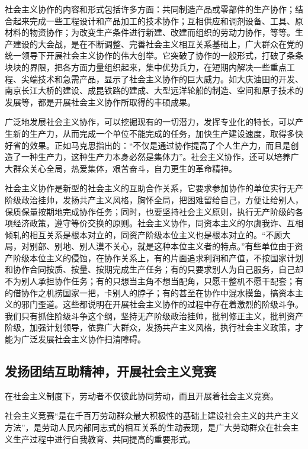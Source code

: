 \documentclass{book}
\begin{document}
社会主义协作的内容和形式包括许多方面：共同制造产品或零部件的生产协作；结合起来完成一些工程设计和产品加工的技术协作；互相供应和调剂设备、工具、原材料的物资协作；为改变生产条件进行新建、改建而组织的劳动力协作，等等。生产建设的大会战，是在不断调整、完善社会主义相互关系基础上，广大群众在党的统一领导下开展社会主义协作的伟大创举。它突破了协作的一般形式，打破了条条块块的界限，把各方面力量组织起来，集中优势兵力，在短期内解决一些重点工程、尖端技术和急需产品，显示了社会主义协作的巨大威力。如大庆油田的开发、南京长江大桥的建设、成昆铁路的建成、大型远洋轮船的制造、空间和原子技术的发展等，都是开展社会主义协作所取得的丰硕成果。

广泛地发展社会主义协作，可以挖掘现有的一切潜力，发挥专业化的特长，可以产生新的生产力，从而完成一个单位不能完成的任务，加快生产建设速度，取得多快好省的效果。正如马克思指出的：“不仅是通过协作提高了个人生产力，而且是创造了一种生产力，这种生产力本身必然是集体力”。社会主义协作，还可以培养广大群众关心全局，热爱集体，艰苦奋斗，自力更生的革命精神。

社会主义协作是新型的社会主义的互助合作关系，它要求参加协作的单位实行无产阶级政治挂帅，发扬共产主义风格，胸怀全局，把困难留给自己，方便让给别人，保质保量按期地完成协作任务；同时，也要坚持社会主义原则，执行无产阶级的各项经济政策，遵守等价交换的原则。社会主义协作，同资本主义的尔虞我诈、互相倾轧的相互关系是根本对立的，同资产阶级本位主义也是根本对立的。“不顾大局，对别部、别地、别人漠不关心，就是这种本位主义者的特点。”有些单位由于资产阶级本位主义的侵蚀，在协作关系上，有的片面追求利润和产值，不按国家计划和协作合同按质、按量、按期完成生产任务；有的只要求别人为自己服务，自己却不为别人承担协作任务；有的只想当主角不想当配角，只愿干整机不愿干配套；有的借协作之机捞国家一把，卡别人的脖子；有的甚至在协作中混水摸鱼，搞资本主义的邪门歪道。这些都说明在开展社会主义协作的过程中存在着激烈的阶级斗争。我们只有抓住阶级斗争这个纲，坚持无产阶级政治挂帅，批判修正主义，批判资产阶级，加强计划领导，依靠广大群众，发扬共产主义风格，执行社会主义政策，才能为广泛发展社会主义协作扫清障碍。

\subsection{发扬团结互助精神，开展社会主义竞赛}

在社会主义制度下，劳动者不仅彼此协同劳动，而且开展着社会主义竞赛。

社会主义竞赛“是在千百万劳动群众最大积极性的基础上建设社会主义的共产主义方法”，是劳动人民内部同志式的相互关系的生动表现，是广大劳动群众在社会主义生产过程中进行自我教育、共同提高的重要形式。
\end{document}
